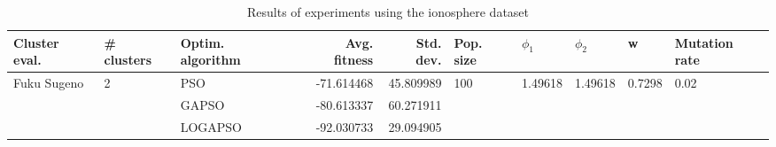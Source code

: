 \begin{table}
\centering
\caption{Results of experiments using the ionosphere dataset}
\begin{tabular}{lllrrlllll}
\toprule
               Cluster eval. &        \# clusters & Optim. algorithm &  Avg. fitness &  Std. dev. &            Pop. size &               $\phi_{1}$ &               $\phi_{2}$ &                       w &         Mutation rate \\
\midrule
\multirow{3}{*}{Fuku Sugeno} & \multirow{3}{*}{2} &              PSO &    -71.614468 &  45.809989 & \multirow{3}{*}{100} & \multirow{3}{*}{1.49618} & \multirow{3}{*}{1.49618} & \multirow{3}{*}{0.7298} & \multirow{3}{*}{0.02} \\
                             &                    &            GAPSO &    -80.613337 &  60.271911 &                      &                          &                          &                         &                       \\
                             &                    &          LOGAPSO &    -92.030733 &  29.094905 &                      &                          &                          &                         &                       \\
\bottomrule
\end{tabular}
\end{table}

